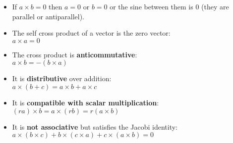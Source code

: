 \begin{itemize}
    \item If $a \times b = 0$ then $a = 0$ or $b = 0$ or the sine between them is $0$ (they are parallel or antiparallel).
    \item The self cross product of a vector is the zero vector: \\ $a \times a = 0$
    \item The cross product is \textbf{anticommutative}:\\ $a \times b = - (b \times a)$
    \item It is \textbf{distributive} over addition:\\ $a \times (b+c) = a \times b + a \times c$
    \item It is \textbf{compatible with scalar multiplication}:\\ $(ra) \times b = a \times (rb) = r(a \times b)$
    \item It is \textbf{not associative} but satisfies the Jacobi identity:\\ $a \times (b \times c) + b \times(c \times a) + c \times(a \times b ) = 0$
\end{itemize}
